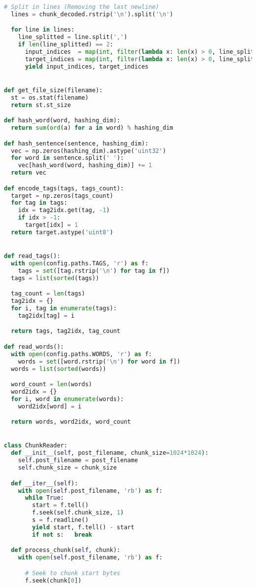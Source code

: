 \begin{lstlisting}[language=python]
  # Split in lines (Removing the last newline)
  lines = chunk_decoded.rstrip('\n').split('\n')

  for line in lines:
    line_splitted = line.split(',')
    if len(line_splitted) == 2:
      input_indices  = map(int, filter(lambda x: len(x) > 0, line_splitted[0].split(' ')))
      target_indices = map(int, filter(lambda x: len(x) > 0, line_splitted[1].split(' ')))
      yield input_indices, target_indices


def get_file_size(filename):
  st = os.stat(filename)
  return st.st_size

def hash_word(word, hashing_dim):
  return sum(ord(a) for a in word) % hashing_dim

def hash_sentence(sentence, hashing_dim):
  vec = np.zeros(hashing_dim).astype('uint32')
  for word in sentence.split(' '):
    vec[hash_word(word, hashing_dim)] += 1
  return vec

def encode_tags(tags, tags_count):
  target = np.zeros(tags_count)
  for tag in tags:
    idx = tag2idx.get(tag, -1)
    if idx > -1:
      target[idx] = 1
  return target.astype('uint8')


def read_tags():
  with open(config.paths.TAGS, 'r') as f:
    tags = set([tag.rstrip('\n') for tag in f])
  tags = list(sorted(tags))

  tag_count = len(tags)
  tag2idx = {}
  for i, tag in enumerate(tags):
    tag2idx[tag] = i

  return tags, tag2idx, tag_count

def read_words():
  with open(config.paths.WORDS, 'r') as f:
    words = set([word.rstrip('\n') for word in f])
  words = list(sorted(words))

  word_count = len(words)
  word2idx = {}
  for i, word in enumerate(words):
    word2idx[word] = i

  return words, word2idx, word_count


class ChunkReader:
  def __init__(self, post_filename, chunk_size=1024*1024):
    self.post_filename = post_filename
    self.chunk_size = chunk_size

  def __iter__(self):
    with open(self.post_filename, 'rb') as f:
      while True:
        start = f.tell()
        f.seek(self.chunk_size, 1)
        s = f.readline()
        yield start, f.tell() - start
        if not s:   break

  def process_chunk(self, chunk):
    with open(self.post_filename, 'rb') as f:

      # Seek to chunk start bytes
      f.seek(chunk[0])


\end{lstlisting}
